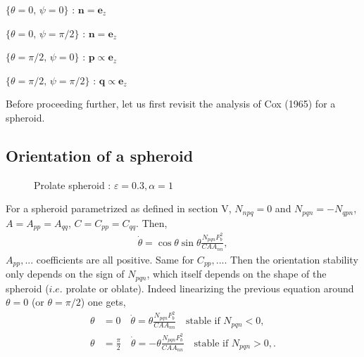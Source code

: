 \documentclass[12pt]{My_preprint}
\begin{document}
$\{\theta = 0, \, \psi = 0\}$ : $\bm n  = \bm e_z$

$\{\theta = 0, \, \psi = \pi/2\}$ : $\bm n  = \bm e_z$

$\{\theta = \pi/2, \, \psi = 0\}$ : $\bm p  \propto \bm e_z$

$\{\theta = \pi/2, \, \psi = \pi/2\}$ : $\bm q  \propto \bm e_z$

Before proceeding further, let us first revisit the analysis of Cox (1965) for a spheroid.


\subsection{Orientation of a spheroid}
\begin{figure}
    \centering
{}
    \caption{Prolate spheroid : $\varepsilon = 0.3, \alpha = 1$}
\end{figure}

For a spheroid parametrized as defined in section V,  $N_{npq} = 0$  and $N_{pqn} = - N_{qpn}$, $A = A_{pp} =A_{qq}$, $C = C_{pp} =C_{qq}$. 
Then, 
\begin{align}
    \dot \theta  = \cos \theta \sin \theta \frac{N_{pqn}F_b^2}{CA A_{nn}},
\end{align}
$A_{pp}, ...$ coefficients are all positive. Same for $C_{pp}, ...$. 
Then the orientation stability only depends on the sign of $N_{pqn}$, which itself depends on the shape of the spheroid ($i.e.$ prolate or oblate).
Indeed linearizing the previous equation around $\theta =0$ (or $\theta =\pi/2$) one gets,
\begin{align}
 \theta &= 0 \quad   \dot \theta  =  \theta \frac{N_{pqn}F_b^2}{CA A_{nn}} \quad \text{stable if $N_{pqn}< 0$}, \\
 \theta &= \frac{\pi}{2} \quad   \dot \theta  =  -\theta \frac{N_{pqn}F_b^2}{CA A_{nn}} \quad \text{stable if $N_{pqn}> 0$},.
\end{align}
\end{document}
